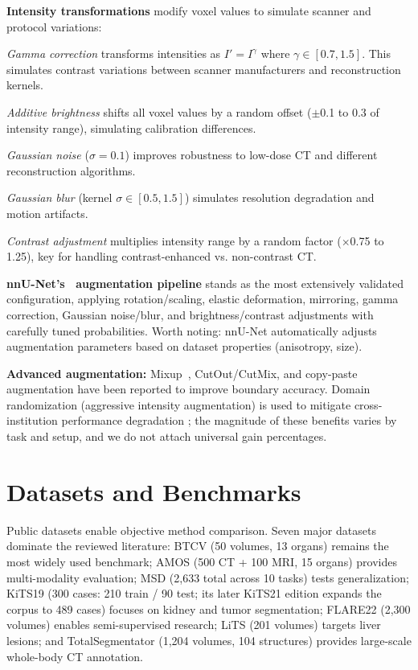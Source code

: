 \textbf{Intensity transformations} modify voxel values to simulate scanner and protocol variations:

\emph{Gamma correction} transforms intensities as $I' = I^\gamma$ where $\gamma \in [0.7, 1.5]$. This simulates contrast variations between scanner manufacturers and reconstruction kernels.

\emph{Additive brightness} shifts all voxel values by a random offset ($\pm$0.1 to 0.3 of intensity range), simulating calibration differences.

\emph{Gaussian noise} ($\sigma = 0.1$) improves robustness to low-dose CT and different reconstruction algorithms.

\emph{Gaussian blur} (kernel $\sigma \in [0.5, 1.5]$) simulates resolution degradation and motion artifacts.

\emph{Contrast adjustment} multiplies intensity range by a random factor ($\times$0.75 to 1.25), key for handling contrast-enhanced vs. non-contrast CT.

\textbf{nnU-Net's~\cite{isensee2021nnunet} augmentation pipeline} stands as the most extensively validated configuration, applying rotation/scaling, elastic deformation, mirroring, gamma correction, Gaussian noise/blur, and brightness/contrast adjustments with carefully tuned probabilities. Worth noting: nnU-Net automatically adjusts augmentation parameters based on dataset properties (anisotropy, size).

\textbf{Advanced augmentation:} Mixup~\cite{zhang2018mixup}, CutOut/CutMix, and copy-paste augmentation have been reported to improve boundary accuracy. Domain randomization (aggressive intensity augmentation) is used to mitigate cross-institution performance degradation \cite{isensee2021nnunet, wasserthal2023totalsegmentator}; the magnitude of these benefits varies by task and setup, and we do not attach universal gain percentages.

\FloatBarrier

\section{Datasets and Benchmarks}
\label{sec:datasets}

Public datasets enable objective method comparison. Seven major datasets dominate the reviewed literature: BTCV \cite{btcv2015} (50 volumes, 13 organs) remains the most widely used benchmark; AMOS \cite{amos2022} (500 CT + 100 MRI, 15 organs) provides multi-modality evaluation; MSD \cite{msd2022} (2,633 total across 10 tasks) tests generalization; KiTS19 \cite{kits2020} (300 cases: 210 train / 90 test; its later KiTS21 edition expands the corpus to 489 cases) focuses on kidney and tumor segmentation; FLARE22 \cite{flare2022} (2,300 volumes) enables semi-supervised research; LiTS \cite{lits2022} (201 volumes) targets liver lesions; and TotalSegmentator \cite{wasserthal2023totalsegmentator} (1,204 volumes, 104 structures) provides large-scale whole-body CT annotation.

